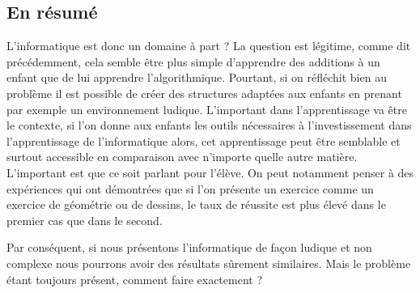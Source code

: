 \subsection{En résumé}

L'informatique est donc un domaine à part ? La question est légitime, comme dit précédemment, cela semble être plus simple d'apprendre des additions à un enfant que de lui apprendre l'algorithmique. Pourtant, si on réfléchit bien au problème il est possible de créer des structures adaptées aux enfants en prenant par exemple un environnement ludique. L'important dans l'apprentissage va être le contexte, si l'on donne aux enfants les outils nécessaires à l'investissement dans l'apprentissage de l'informatique alors, cet apprentissage peut être semblable et surtout accessible en comparaison avec n'importe quelle autre matière. L'important est que ce soit parlant pour l'élève. On peut notamment penser à des expériences qui ont démontrées que si l'on présente un exercice comme un exercice de géométrie ou de dessins, le taux de réussite est plus élevé dans le premier cas que dans le second. \cite{6} \cite{7}

Par conséquent, si nous présentons l'informatique de façon ludique et non complexe nous pourrons avoir des résultats sûrement similaires. Mais le problème étant toujours présent, comment faire  exactement ?

